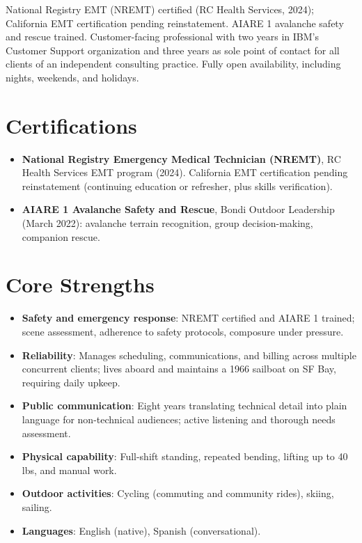 \documentclass[11pt,a4paper,sans]{moderncv}
\begin{document}
\makecvtitle

\vspace{2pt}
\small{National Registry EMT (NREMT) certified (RC Health Services, 2024); California EMT certification pending reinstatement. AIARE 1 avalanche safety and rescue trained. Customer-facing professional with two years in IBM's Customer Support organization and three years as sole point of contact for all clients of an independent consulting practice. Fully open availability, including nights, weekends, and holidays.}

\section{Certifications}
\begin{itemize}
\item \textbf{National Registry Emergency Medical Technician (NREMT)}, RC Health Services EMT program (2024). California EMT certification pending reinstatement (continuing education or refresher, plus skills verification).
\item \textbf{AIARE 1 Avalanche Safety and Rescue}, Bondi Outdoor Leadership (March 2022): avalanche terrain recognition, group decision-making, companion rescue.
\end{itemize}

\section{Core Strengths}
\begin{itemize}
\item \textbf{Safety and emergency response}: NREMT certified and AIARE 1 trained; scene assessment, adherence to safety protocols, composure under pressure.
\item \textbf{Reliability}: Manages scheduling, communications, and billing across multiple concurrent clients; lives aboard and maintains a 1966 sailboat on SF Bay, requiring daily upkeep.
\item \textbf{Public communication}: Eight years translating technical detail into plain language for non-technical audiences; active listening and thorough needs assessment.
\item \textbf{Physical capability}: Full-shift standing, repeated bending, lifting up to 40 lbs, and manual work.
\item \textbf{Outdoor activities}: Cycling (commuting and community rides), skiing, sailing.
\item \textbf{Languages}: English (native), Spanish (conversational).
\end{itemize}
\end{document}
